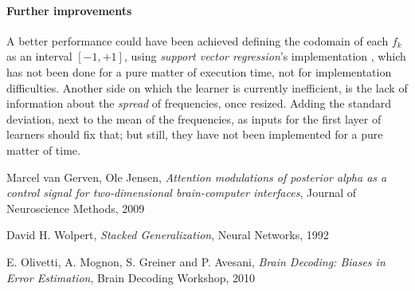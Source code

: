 \documentclass[10pt]{article}
\begin{document}
\paragraph{Further improvements} A better performance could have been achieved defining the codomain of each $f_k$ as an interval $[-1, +1]$, using \emph{support vector regression}'s implementation , which has not been done for a pure matter of execution time, not for implementation difficulties.
Another side on which the learner is currently inefficient, is the lack of information about the \emph{spread} of frequencies, once resized. Adding the standard deviation, next to the mean of the frequencies, as inputs for the first layer of learners should fix that; but still, they have not been implemented for a pure matter of time.



\begin{thebibliography}{9}

Marcel van Gerven, Ole Jensen,
\emph{Attention modulations of posterior alpha as a control signal for two-dimensional brain-computer interfaces},
Journal of Neuroscience Methods, 2009


David H. Wolpert,
\emph{Stacked Generalization},
Neural Networks, 1992

E. Olivetti, A. Mognon, S. Greiner and P. Avesani, 
\emph{Brain Decoding: Biases in Error Estimation}, 
Brain Decoding Workshop, 2010

\end{thebibliography}
\end{document}
